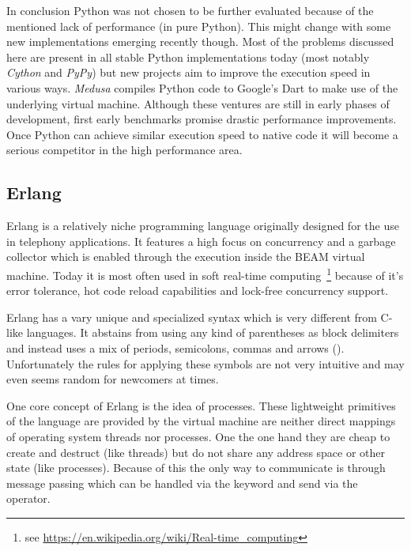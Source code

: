 In conclusion Python was not chosen to be further evaluated because of the mentioned lack of performance (in pure Python). This might change with some new implementations emerging recently though. Most of the problems discussed here are present in all stable Python implementations today (most notably \textit{Cython} and \textit{PyPy}) but new projects aim to improve the execution speed in various ways. \textit{Medusa} compiles Python code to Google's Dart to make use of the underlying virtual machine. Although these ventures are still in early phases of development, first early benchmarks promise drastic performance improvements. Once Python can achieve similar execution speed to native code it will become a serious competitor in the high performance area.

\subsection*{Erlang}
\label{subsec:State_of_the_art::Candidates::Erlang}

Erlang is a relatively niche programming language originally designed for the use in telephony applications. It features a high focus on concurrency and a garbage collector which is enabled through the execution inside the BEAM virtual machine. Today it is most often used in soft real-time computing~\footnote{see \url{https://en.wikipedia.org/wiki/Real-time_computing}} because of it's error tolerance, hot code reload capabilities and lock-free concurrency support.~\cite{intro_erlang}

Erlang has a vary unique and specialized syntax which is very different from C-like languages. It abstains from using any kind of parentheses as block delimiters and instead uses a mix of periods, semicolons, commas and arrows (\markdowninline{->}). Unfortunately the rules for applying these symbols are not very intuitive and may even seems random for newcomers at times.

One core concept of Erlang is the idea of processes. These lightweight primitives of the language are provided by the virtual machine are neither direct mappings of operating system threads nor processes. One the one hand they are cheap to create and destruct (like threads) but do not share any address space or other state (like processes). Because of this the only way to communicate is through message passing which can be handled via the  keyword and send via the \markdowninline{!} operator.~\cite{erlang_phd, intro_erlang}
\\



